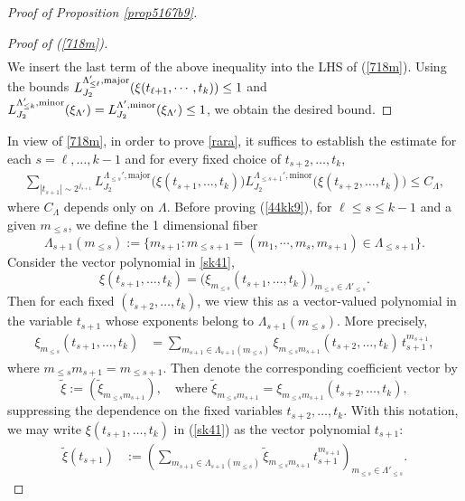 \documentclass[11 pt,letterpaper]{amsart}
\theoremstyle{plain}
\theoremstyle{definition}
\theoremstyle{remark} \theoremstyle{exam} \theoremstyle{ob}
\numberwithin{equation}{section}
\begin{document}
\begin{proof}[Proof of Proposition \ref{prop5167b9}]
\begin{proof}[Proof of (\ref{718m})]
\begin{align*}
\end{align*} 
We insert the last term of the above inequality into the  LHS of (\ref{718m}). Using  the bounds $ L^{\Lambda_{\le \ell}',\rm{major}}_{J_2}(\xi(t_{\ell+1},\cdots,t_k) )\le 1$ and  $L^{\Lambda_{\le k}',\rm{minor}}_{J_2}(\xi_{\Lambda'})=L^{\Lambda',\rm{minor}}_{J_2}(\xi_{\Lambda'})\le 1$, we obtain the desired bound.
\end{proof}
In view of \eqref{718m}, in order to prove \eqref{rara}, it suffices to establish the estimate for each $s=\ell,\dots,k-1$ and for every fixed choice of $t_{s+2},\dots,t_k$,
\begin{align}\label{44kk9}
\sum_{|t_{s+1}|\sim 2^{j_{s+1}}}
L^{\Lambda_{\le s}',\mathrm{major}}_{J_2}\bigl(\xi(t_{s+1},\dots,t_k)\bigr)
L^{\Lambda_{\le s+1}',\mathrm{minor}}_{J_2}\bigl(\xi(t_{s+2},\dots,t_k)\bigr)
\le C_{\Lambda},
\end{align}
  where $C_{\Lambda}$ depends only on $\Lambda$. 
 Before proving (\ref{44kk9}), for $\ell \le s\le k-1$ and
a given $m_{\le s}$, 
we  define the 1 dimensional fiber $$\Lambda_{s+1}(m_{\le s}):=\{m_{s+1}: m_{\le s+1}=(m_1,\cdots,m_s,m_{s+1})\in \Lambda_{\le s+1}\}.$$
Consider the vector polynomial  in \eqref{sk41},
\[
\xi(t_{s+1},\dots,t_k)
= \bigl(\xi_{m_{\le s}}(t_{s+1},\dots,t_k)\bigr)_{m_{\le s}\in \Lambda'_{\le s}}.
\]
Then for each fixed $(t_{s+2},\dots,t_k)$, we view this as a vector-valued polynomial in the variable $t_{s+1}$ whose exponents belong to $\Lambda_{s+1}(m_{\le s})$. More precisely,
\begin{align*}
\xi_{m_{\le s}}(t_{s+1},\dots,t_k)
&= \sum_{m_{s+1}\in \Lambda_{s+1}(m_{\le s})}
\xi_{m_{\le s}m_{s+1}}(t_{s+2},\dots,t_k)\, t_{s+1}^{m_{s+1}},
\end{align*}
where $m_{\le s}m_{s+1} = m_{\le s+1}$.
Then    denote the corresponding coefficient vector by
\[
\tilde{\xi} := (\tilde{\xi}_{m_{\le s}m_{s+1}}),
\quad \text{where } \tilde{\xi}_{m_{\le s}m_{s+1}}
= \xi_{m_{\le s}m_{s+1}}(t_{s+2},\dots,t_k),
\]
suppressing the dependence on the fixed variables $t_{s+2},\dots,t_k$. With this notation, we may write $
\xi(t_{s+1},\dots,t_k)$ in (\ref{sk41}) as the  vector polynomial $t_{s+1}$:
\begin{align*}
\tilde{\xi}(t_{s+1})
&:= \left(
\sum_{m_{s+1}\in \Lambda_{s+1}(m_{\le s})}
\tilde{\xi}_{m_{\le s}m_{s+1}}\, t_{s+1}^{m_{s+1}}
\right)_{m_{\le s}\in \Lambda'_{\le s}}.
\end{align*}
 

\end{proof}
\end{document}
